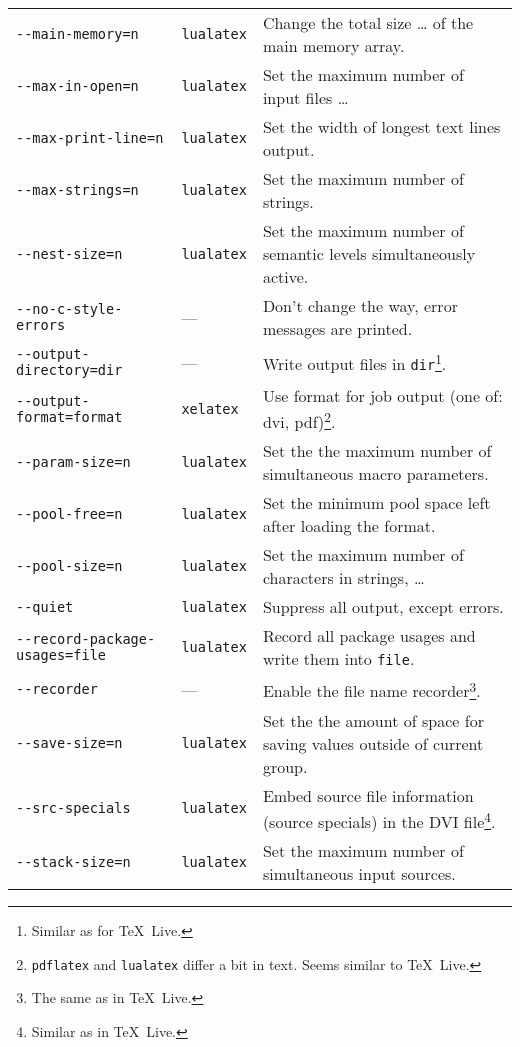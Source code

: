 \documentclass{article}
\newcommand{\pdflatex}{\texttt{pdflatex}}
\newcommand{\lualatex}{\texttt{lualatex}}
\newcommand{\xelatex}{\texttt{xelatex}}
\newcommand{\texlive}{\TeX~Live}
\begin{document}
\begin{longtable}{|lll|}
\texttt{-{}-main-memory=n}           & \lualatex{} & Change the total size \dots{} of the main memory array. \\
\texttt{-{}-max-in-open=n}           & \lualatex{} & Set the maximum number of input files \dots \\
\texttt{-{}-max-print-line=n}        & \lualatex{} & Set the width of longest text lines output. \\
\texttt{-{}-max-strings=n}           & \lualatex{} & Set the maximum number of strings. \\
\texttt{-{}-nest-size=n}             & \lualatex{} & Set the maximum number of semantic levels simultaneously active. \\
\texttt{-{}-no-c-style-errors}       & ---         & Don't change the way, error messages are printed. \\
\texttt{-{}-output-directory=dir}    & ---         & Write output files in \texttt{dir}\footnote%
{Similar as for \texlive. }. \\
\texttt{-{}-output-format=format}    & \xelatex{}  & Use format for job output (one of: dvi, pdf)\footnote%
{\pdflatex{} and \lualatex{} differ a bit in text. Seems similar to \texlive. }. \\
\texttt{-{}-param-size=n}            & \lualatex{} & Set the the maximum number of simultaneous macro parameters. \\
\texttt{-{}-pool-free=n}             & \lualatex{} & Set the minimum pool space left after loading the format. \\
\texttt{-{}-pool-size=n}             & \lualatex{} & Set the maximum number of characters in strings, \dots \\
\texttt{-{}-quiet}                   & \lualatex{} & Suppress all output, except errors. \\
\texttt{-{}-record-package-usages=file} & \lualatex{} & Record all package usages and write them into \texttt{file}. \\
\texttt{-{}-recorder}                & ---         & Enable the file name recorder\footnote%
{The same as in \texlive. }. \\
\texttt{-{}-save-size=n}             & \lualatex{} & Set the the amount of space for saving values outside of current group. \\
\texttt{-{}-src-specials}            & \lualatex{} & Embed source file information (source specials) in the DVI file\footnote%
{Similar as in \texlive. }. \\
\texttt{-{}-stack-size=n}            & \lualatex{} & Set the maximum number of simultaneous input sources. \\

\end{longtable}
\end{document}
